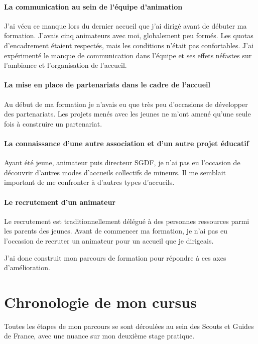 \documentclass[titlepage,11pt,a4paper]{article}
\begin{document}
\paragraph{La communication au sein de l'équipe d'animation} J'ai vécu ce manque lors du
dernier accueil que j'ai dirigé avant de débuter ma formation. J'avais cinq animateurs avec moi,
globalement peu formés. Les quotas d'encadrement étaient respectés, mais les conditions
n'était pas confortables. J'ai expérimenté le manque de communication dans l'équipe et ses
effets néfastes sur l'ambiance et l'organisation de l'accueil.

\paragraph{La mise en place de partenariats dans le cadre de l'accueil} Au début de ma
formation je n'avais eu que très peu d'occasions de développer des partenariats. Les
projets menés avec les jeunes ne m'ont amené qu'une seule fois à construire un
partenariat.

\paragraph{La connaissance d'une autre association et d'un autre projet éducatif} Ayant
été jeune, animateur puis directeur SGDF, je n'ai pas eu l'occasion de découvrir d'autres
modes d'accueils collectifs de mineurs. Il me semblait important de me confronter à
d'autres types d'accueils.

\paragraph{Le recrutement d'un animateur} Le recrutement est traditionnellement délégué à
des personnes ressources parmi les parents des jeunes. Avant de commencer ma formation, je
n'ai pas eu l'occasion de recruter un animateur pour un accueil que je dirigeais.

J'ai donc construit mon parcours de formation pour répondre à ces axes d'amélioration.


\clearpage
\section{Chronologie de mon cursus}

Toutes les étapes de mon parcours se sont déroulées au sein des Scouts et Guides de
France, avec une nuance sur mon deuxième stage pratique.
\end{document}
